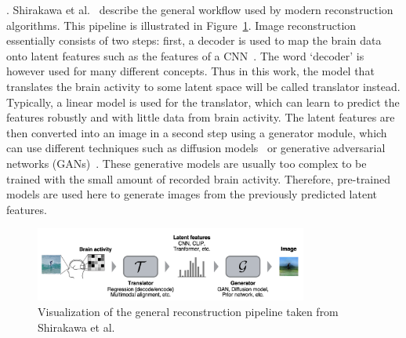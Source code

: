 . 
Shirakawa et al.~\cite{shirakawaSpuriousReconstructionBrain2024} describe the general workflow used by modern reconstruction algorithms. This pipeline is illustrated in Figure~\ref{fig:recon_pipeline}. Image reconstruction essentially consists of two steps: first, a decoder is used to map the brain data onto latent features such as the features of a CNN~\cite{horikawaGenericDecodingSeen2017}. The word `decoder' is however used for many different concepts. Thus in this work, the model that translates the brain activity to some latent space will be called translator instead. 
Typically, a linear model is used for the translator, which can learn to predict the features robustly and with little data from brain activity. 
The latent features are then converted into an image in a second step using a generator module, which can use different techniques such as diffusion models~\cite{xuVersatileDiffusionText2024,ozcelikNaturalSceneReconstruction2023} or generative adversarial networks (GANs)~\cite{chengReconstructingVisualIllusory2023}. These generative models are usually too complex to be trained with the small amount of recorded brain activity. Therefore, pre-trained models are used here to generate images from the previously predicted latent features.

\begin{figure}[ht]
    \centering
    \includegraphics[width=0.8\textwidth]{plots/01_background_shirakawa_recon_pipeline.png}
    \caption[General reconstruction pipeline]{Visualization of the general reconstruction pipeline taken from Shirakawa et al.~\cite{shirakawaSpuriousReconstructionBrain2024}}\label{fig:recon_pipeline}
\end{figure}


